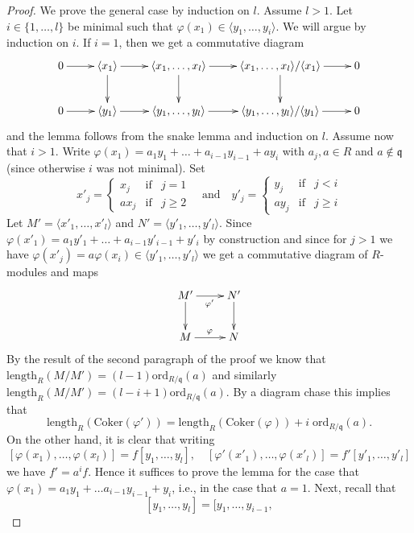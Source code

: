 \begin{proof}
\medskip\noindent
We prove the general case by induction on $l$. Assume $l > 1$.
Let $i \in \{1, \ldots, l\}$ be minimal such that
$\varphi(x_1) \in \langle y_1, \ldots, y_i\rangle$.
We will argue by induction on $i$.
If $i = 1$, then we get a commutative diagram
$$
\xymatrix{
0 \ar[r] &
\langle x_1 \rangle \ar[r] \ar[d] &
\langle x_1, \ldots, x_l \rangle \ar[r] \ar[d] &
\langle x_1, \ldots, x_l \rangle / \langle x_1 \rangle \ar[r] \ar[d] &
0 \\
0 \ar[r] &
\langle y_1 \rangle \ar[r] &
\langle y_1, \ldots, y_l \rangle \ar[r] &
\langle y_1, \ldots, y_l \rangle / \langle y_1 \rangle \ar[r] &
0
}
$$
and the lemma follows from the snake lemma and induction on $l$.
Assume now that $i > 1$.
Write $\varphi(x_1) = a_1 y_1 + \ldots + a_{i - 1} y_{i - 1} + a y_i$
with $a_j, a \in R$ and $a \not \in \mathfrak q$ (since otherwise
$i$ was not minimal). Set
$$
x'_j =
\left\{
\begin{matrix}
x_j & \text{if} & j = 1 \\
ax_j & \text{if} & j \geq 2
\end{matrix}
\right.
\quad\text{and}\quad
y'_j =
\left\{
\begin{matrix}
y_j & \text{if} & j < i \\
ay_j & \text{if} & j \geq i
\end{matrix}
\right.
$$
Let $M' = \langle x'_1, \ldots, x'_l \rangle$ and 
$N' = \langle y'_1, \ldots, y'_l \rangle$.
Since $\varphi(x'_1) = a_1 y'_1 + \ldots + a_{i - 1} y'_{i - 1} + y'_i$
by construction and since for $j > 1$ we have
$\varphi(x'_j) = a\varphi(x_i) \in \langle y'_1, \ldots, y'_l\rangle$
we get a commutative diagram of $R$-modules and maps
$$
\xymatrix{
M' \ar[d] \ar[r]_{\varphi'} & N' \ar[d] \\
M \ar[r]^\varphi & N
}
$$
By the result of the second paragraph of the proof we know
that $\text{length}_R(M/M') = (l - 1)\text{ord}_{R/\mathfrak q}(a)$
and similarly
$\text{length}_R(M/M') = (l - i + 1)\text{ord}_{R/\mathfrak q}(a)$.
By a diagram chase this implies that
$$
\text{length}_R(\text{Coker}(\varphi')) =
\text{length}_R(\text{Coker}(\varphi)) + i\;\text{ord}_{R/\mathfrak q}(a).
$$
On the other hand, it is clear that writing
$$
[\varphi(x_1), \ldots, \varphi(x_l)] = f [y_1, \ldots, y_l],
\quad
[\varphi'(x'_1), \ldots, \varphi(x'_l)] = f' [y'_1, \ldots, y'_l]
$$
we have $f' = a^if$. Hence it suffices to prove the lemma for the
case that $\varphi(x_1) = a_1y_1 + \ldots a_{i - 1}y_{i - 1} + y_i$,
i.e., in the case that $a = 1$. Next, recall that
$$
[y_1, \ldots, y_l] = [y_1, \ldots, y_{i - 1},
$$
\end{proof}
